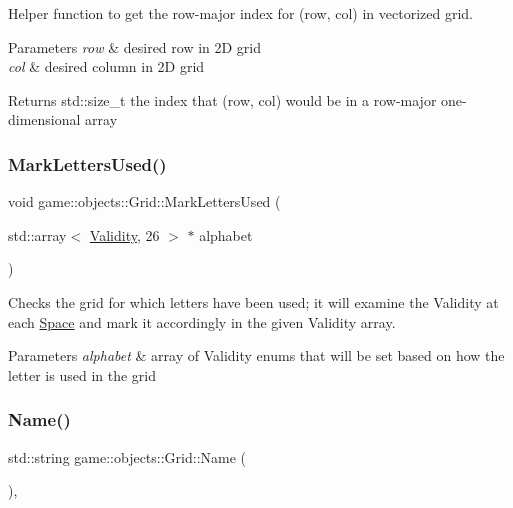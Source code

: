 Helper function to get the row-\/major index for (row, col) in vectorized grid. 


\begin{DoxyParams}{Parameters}
{\em row} & desired row in 2D grid \\
\hline
{\em col} & desired column in 2D grid \\
\hline
\end{DoxyParams}
\begin{DoxyReturn}{Returns}
std\+::size\+\_\+t the index that (row, col) would be in a row-\/major one-\/dimensional array 
\end{DoxyReturn}
\mbox{\label{classgame_1_1objects_1_1Grid_aba01074c988b3732d7de432c5dd558ac}} 
\subsubsection{\texorpdfstring{Mark\+Letters\+Used()}{MarkLettersUsed()}}
{\footnotesize\ttfamily void game\+::objects\+::\+Grid\+::\+Mark\+Letters\+Used (\begin{DoxyParamCaption}\item[{std\+::array$<$ \hyperlink{Validity_8h_acb8ce664e8a953fe8c27d7f0b37cbca4}{Validity}, 26 $>$ $\ast$}]{alphabet }\end{DoxyParamCaption})}



Checks the grid for which letters have been used; it will examine the Validity at each \hyperlink{classgame_1_1objects_1_1Space}{Space} and mark it accordingly in the given Validity array. 


\begin{DoxyParams}{Parameters}
{\em alphabet} & array of Validity enums that will be set based on how the letter is used in the grid \\
\hline
\end{DoxyParams}
\mbox{\label{classgame_1_1objects_1_1Grid_a1a10441dea475af11c796995af6e9855}} 
\subsubsection{\texorpdfstring{Name()}{Name()}}
{\footnotesize\ttfamily std\+::string game\+::objects\+::\+Grid\+::\+Name (\begin{DoxyParamCaption}{ }\end{DoxyParamCaption})\hspace{0.3cm}{\ttfamily [override]}, {\ttfamily [virtual]}}



